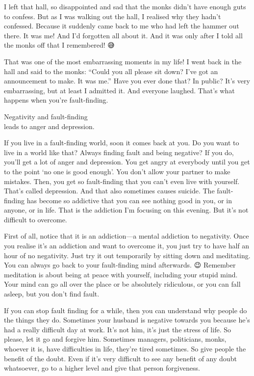\documentclass[12pt, openany]{book}
\newenvironment{aphorism}%
{%
\begin{center}\begin{itshape}
}%
{\end{itshape}\end{center}
}%
\begin{document}
I left that hall, so disappointed and sad that the monks didn’t have enough guts to confess. But as I was walking out the hall, I realised why they hadn’t confessed. Because it suddenly came back to me who had left the hammer out there. It was me! And I’d forgotten all about it. And it was only after I told all the monks off that I remembered! 😅

That was one of the most embarrassing moments in my life! I went back in the hall and said to the monks: “Could you all please sit down? I’ve got an announcement to make. It was me.” Have you ever done that? In public? It’s very embarrassing, but at least I admitted it. And everyone laughed. That’s what happens when you’re fault-finding. 

\begin{aphorism}
Negativity and fault-finding\\  
leads to anger and depression.
\end{aphorism}

If you live in a fault-finding world, soon it comes back at you. Do you want to live in a world like that? Always finding fault and being negative? If you do, you’ll get a lot of anger and depression. You get angry at everybody until you get to the point ‘no one is good enough’. You don’t allow your partner to make mistakes. Then, you get so fault-finding that you can’t even live with yourself. That’s called depression. And that also sometimes causes suicide. The fault-finding has become so addictive that you can see nothing good in you, or in anyone, or in life. That is the addiction I’m focusing on this evening. But it’s not difficult to overcome. 

First of all, notice that it is an addiction—a mental addiction to negativity. Once you realise it’s an addiction and want to overcome it, you just try to have half an hour of no negativity. Just try it out temporarily by sitting down and meditating. You can always go back to your fault-finding mind afterwards. 😉 Remember meditation is about being at peace with yourself, including your stupid mind. Your mind can go all over the place or be absolutely ridiculous, or you can fall asleep, but you don’t find fault. 

If you can stop fault finding for a while, then you can understand why people do the things they do. Sometimes your husband is negative towards you because he’s had a really difficult day at work. It’s not him, it’s just the stress of life. So please, let it go and forgive him. Sometimes managers, politicians, monks, whoever it is, have difficulties in life, they’re tired sometimes. So give people the benefit of the doubt. Even if it’s very difficult to see any benefit of any doubt whatsoever, go to a higher level and give that person forgiveness. 
\end{document}
